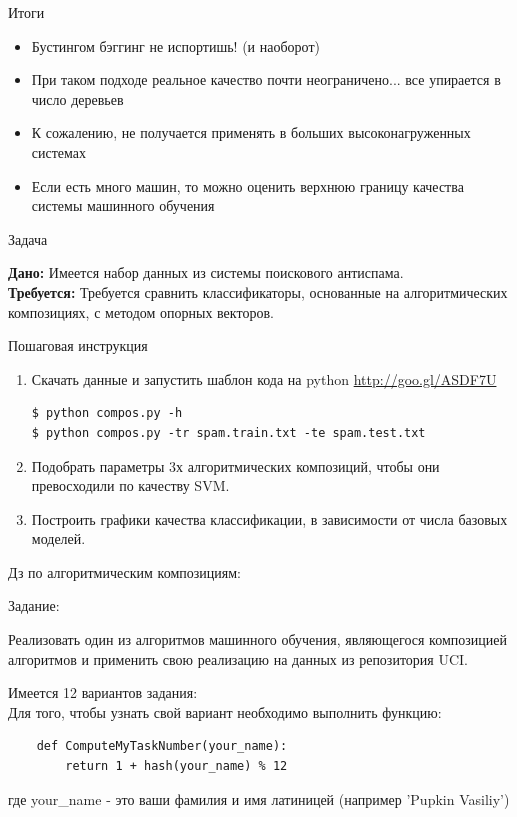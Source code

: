 \documentclass[10pt]{beamer}
\begin{document}
\begin{frame}{Итоги}
\begin{itemize}
    \item Бустингом бэггинг не испортишь! (и наоборот)
    \item При таком подходе реальное качество почти неограничено... все
        упирается в число деревьев
    \item К сожалению, не получается применять в больших высоконагруженных
        системах
    \item Если есть много машин, то можно оценить верхнюю границу качества
        системы машинного обучения
\end{itemize}
\end{frame}

\begin{frame}[fragile]{Задача}

{\bf Дано:} Имеется набор данных из системы поискового антиспама. \\
{\bf Требуется:} Требуется сравнить классификаторы, основанные на
алгоритмических композициях, с методом опорных векторов.

\vspace{1em}
Пошаговая инструкция
\begin{enumerate}
    \item Скачать данные и запустить шаблон кода на python
    \url{http://goo.gl/ASDF7U}
\begin{shaded}
{\color{green} \begin{verbatim}
$ python compos.py -h
$ python compos.py -tr spam.train.txt -te spam.test.txt
\end{verbatim}}
\end{shaded}
    \item Подобрать параметры 3х алгоритмических композиций, чтобы они превосходили
    по качеству SVM.
    \item Построить графики качества классификации, в зависимости от числа базовых
    моделей.
\end{enumerate}

\end{frame}

\begin{frame}[fragile]{Дз по алгоритмическим композициям:}
    \begin{block}{Задание:}
\end{block}
    Реализовать один из алгоритмов машинного обучения, являющегося композицией
    алгоритмов и применить свою реализацию на данных из репозитория UCI.

\vspace{1em}
Имеется 12 вариантов задания:\\
Для того, чтобы узнать свой вариант необходимо выполнить функцию:
\begin{shaded}
{ \color{green} \begin{verbatim}
    def ComputeMyTaskNumber(your_name):
        return 1 + hash(your_name) % 12
\end{verbatim}}
\end{shaded}
где your\_name - это ваши фамилия и имя латиницей (например 'Pupkin Vasiliy')
\end{frame}
\end{document}
